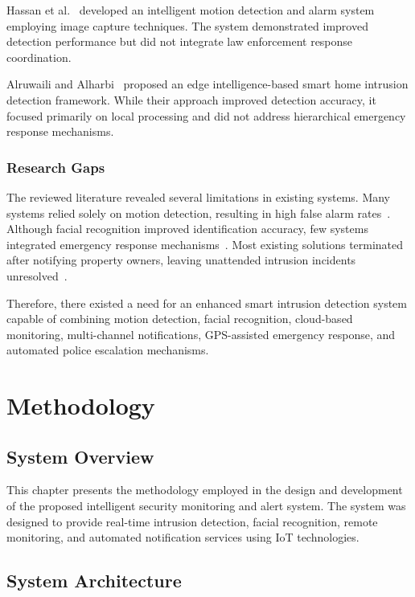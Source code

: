 \documentclass[12pt,a4paper,oneside]{report}
\begin{document}
Hassan et al.~\cite{ref17} developed an intelligent motion detection and alarm system employing image capture techniques. The system demonstrated improved detection performance but did not integrate law enforcement response coordination.

Alruwaili and Alharbi~\cite{ref21} proposed an edge intelligence-based smart home intrusion detection framework. While their approach improved detection accuracy, it focused primarily on local processing and did not address hierarchical emergency response mechanisms.

\subsection{Research Gaps}

The reviewed literature revealed several limitations in existing systems. Many systems relied solely on motion detection, resulting in high false alarm rates~\cite{ref13,ref14}. Although facial recognition improved identification accuracy, few systems integrated emergency response mechanisms~\cite{ref15,ref21}. Most existing solutions terminated after notifying property owners, leaving unattended intrusion incidents unresolved~\cite{ref17,ref25}.

Therefore, there existed a need for an enhanced smart intrusion detection system capable of combining motion detection, facial recognition, cloud-based monitoring, multi-channel notifications, GPS-assisted emergency response, and automated police escalation mechanisms.

\chapter{Methodology}

\section{System Overview}

This chapter presents the methodology employed in the design and development of the proposed intelligent security monitoring and alert system. The system was designed to provide real-time intrusion detection, facial recognition, remote monitoring, and automated notification services using IoT technologies.

\section{System Architecture}
\end{document}

